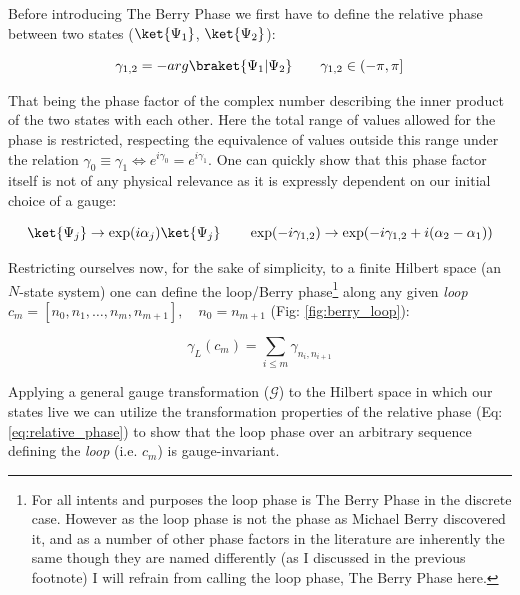 \documentclass{article}
\begin{document}
Before introducing The Berry Phase we first have to define the relative phase between two states ($\ket{\Psi_1}$, $\ket{\Psi_2}$):

  \begin{equation*} \label{eq:relative_phase}
    \gamma_{1,2} = -arg \braket{\Psi_{1}|\Psi_{2}} \qquad \gamma_{1, 2} \in (-\pi, \pi]
  \end{equation*}

That being the phase factor of the complex number describing the inner product of the two states with each other. Here the total range of values allowed for the phase is restricted, respecting the equivalence of values outside this range under the relation $\gamma_{0} \equiv \gamma_{1} \Leftrightarrow e^{i\gamma_{0}} = e^{i\gamma_{1}}$. One can quickly show that this phase factor itself is not of any physical relevance as it is expressly dependent on our initial choice of a gauge:

  \begin{equation*}
    \ket{\Psi_{j}} \rightarrow \exp(i \alpha_{j}) \ket{\Psi_{j}} \quad\quad
    \exp(-i\gamma_{1,2}) \rightarrow \exp(-i\gamma_{1,2} + i(\alpha_{2} - \alpha_{1}))\\
  \end{equation*}

Restricting ourselves now, for the sake of simplicity, to a finite Hilbert space (an $N$-state system) one can define the loop/Berry phase\footnote{For all intents and purposes the loop phase is The Berry Phase in the discrete case. However as the loop phase is not the phase as Michael Berry discovered it, and as a number of other phase factors in the literature are inherently the same though they are named differently (as I discussed in the previous footnote) I will refrain from calling the loop phase, The Berry Phase here.} along any given \textit{loop} $c_m=[n_{0}, n_{1}, \ldots, n_{m}, n_{m+1}], \quad n_{0} = n_{m+1}$ (Fig: \ref{fig:berry_loop}):

  \begin{equation*}
    \gamma_{L}(c_m) = \sum_{i \leq m}\gamma_{n_{i}, n_{i+1}}
  \end{equation*}

Applying a general gauge transformation ($\mathcal{G}$) to the Hilbert space in which our states live we can utilize the transformation properties of the relative phase (Eq: \ref{eq:relative_phase}) to show that the loop phase over an arbitrary sequence defining the \textit{loop} (i.e. $c_m$) is gauge-invariant.
\end{document}

